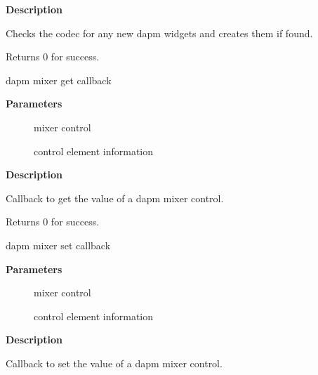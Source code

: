 \documentclass[a4paper,8pt,english]{sphinxmanual}
\begin{document}
\textbf{Description}

Checks the codec for any new dapm widgets and creates them if found.

Returns 0 for success.

\begin{fulllineitems}
\label{sound/kernel-api/alsa-driver-api:c.snd_soc_dapm_get_volsw}
dapm mixer get callback

\end{fulllineitems}


\textbf{Parameters}
\begin{description}
\item[{}] \leavevmode
mixer control

\item[{}] \leavevmode
control element information

\end{description}

\textbf{Description}

Callback to get the value of a dapm mixer control.

Returns 0 for success.

\begin{fulllineitems}
\label{sound/kernel-api/alsa-driver-api:c.snd_soc_dapm_put_volsw}
dapm mixer set callback

\end{fulllineitems}


\textbf{Parameters}
\begin{description}
\item[{}] \leavevmode
mixer control

\item[{}] \leavevmode
control element information

\end{description}

\textbf{Description}

Callback to set the value of a dapm mixer control.
\end{document}
